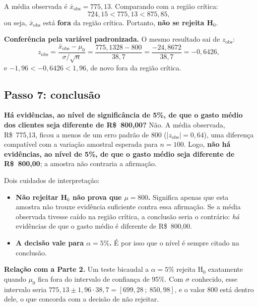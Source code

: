 \documentclass[12pt,a4paper]{article}
\begin{document}
A média observada é $\bar{x}_{\text{obs}} = 775{,}13$. Comparando com a região crítica:
$$724{,}15 < 775{,}13 < 875{,}85,$$
ou seja, $\bar{x}_{\text{obs}}$ está \textbf{fora} da região crítica. Portanto, \textbf{não se rejeita H$_0$}.

\textbf{Conferência pela variável padronizada.} O mesmo resultado sai de $z_{\text{obs}}$:
$$z_{\text{obs}} = \frac{\bar{x}_{\text{obs}} - \mu_0}{\sigma/\sqrt{n}} = \frac{775{,}1328 - 800}{38{,}7} = \frac{-24{,}8672}{38{,}7} = -0{,}6426,$$
e $-1{,}96 < -0{,}6426 < 1{,}96$, de novo fora da região crítica.

\subsection*{Passo 7: conclusão}

\textbf{Há evidências, ao nível de significância de 5\%, de que o gasto médio dos clientes seja diferente de R\$~800,00?} Não. A média observada, R\$~775,13, ficou a menos de um erro padrão de 800 ($|z_{\text{obs}}| = 0{,}64$), uma diferença compatível com a variação amostral esperada para $n = 100$. Logo, \textbf{não há evidências, ao nível de 5\%, de que o gasto médio seja diferente de R\$~800,00}; a amostra não contraria a afirmação.

Dois cuidados de interpretação:
\begin{itemize}[leftmargin=1.5em]
\item \textbf{Não rejeitar H$_0$ não prova que $\mu = 800$.} Significa apenas que esta amostra não trouxe evidência suficiente contra essa afirmação. Se a média observada tivesse caído na região crítica, a conclusão seria o contrário: \emph{há} evidências de que o gasto médio é diferente de R\$~800,00.
\item \textbf{A decisão vale para $\alpha = 5\%$.} É por isso que o nível é sempre citado na conclusão.
\end{itemize}

\textbf{Relação com a Parte 2.} Um teste bicaudal a $\alpha = 5\%$ rejeita H$_0$ exatamente quando $\mu_0$ fica fora do intervalo de confiança de 95\%. Com $\sigma$ conhecido, esse intervalo seria $775{,}13 \pm 1{,}96 \cdot 38{,}7 = [699{,}28\ ;\ 850{,}98]$, e o valor 800 está dentro dele, o que concorda com a decisão de não rejeitar.
\end{document}
